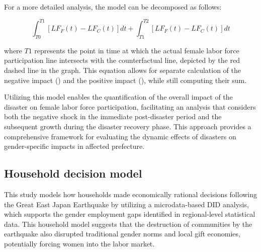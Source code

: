 \documentclass[a4paper,12pt]{article}
\begin{document}
For a more detailed analysis, the model can be decomposed as follows:

\begin{equation}
\int_{T0}^{T1} [LF_F(t) - LF_C(t)] dt + \int_{T1}^{T2} [LF_F(t) - LF_C(t)] dt
\end{equation}

where $T1$ represents the point in time at which the actual female labor force participation line intersects with the counterfactual line, depicted by the red dashed line in the graph. This equation allows for separate calculation of the negative impact () and the positive impact (), while still computing their sum.

Utilizing this model enables the quantification of the overall impact of the disaster on female labor force participation, facilitating an analysis that considers both the negative shock in the immediate post-disaster period and the subsequent growth during the disaster recovery phase. This approach provides a comprehensive framework for evaluating the dynamic effects of disasters on gender-specific impacts in affected prefecture.


\subsection{Household decision model}
\label{sec5.1}

This study models how households made economically rational decisions following the Great East Japan Earthquake by utilizing a microdata-based DID analysis, which supports the gender employment gaps identified in regional-level statistical data. This household model suggests that the destruction of communities by the earthquake also disrupted traditional gender norms and local gift economies, potentially forcing women into the labor market.
\end{document}

